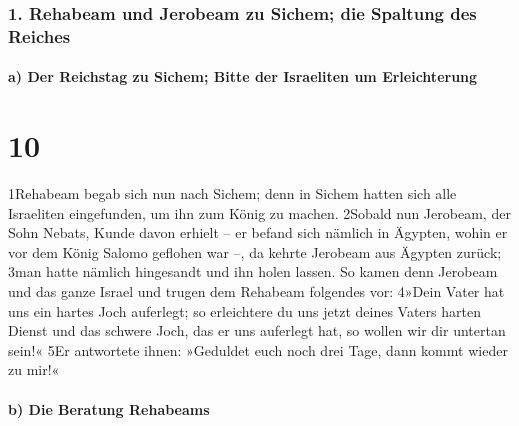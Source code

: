 \hypertarget{rehabeam-und-jerobeam-zu-sichem-die-spaltung-des-reiches}{%
\subsubsection{1. Rehabeam und Jerobeam zu Sichem; die Spaltung des
Reiches}\label{rehabeam-und-jerobeam-zu-sichem-die-spaltung-des-reiches}}

\hypertarget{a-der-reichstag-zu-sichem-bitte-der-israeliten-um-erleichterung}{%
\paragraph{a) Der Reichstag zu Sichem; Bitte der Israeliten um
Erleichterung}\label{a-der-reichstag-zu-sichem-bitte-der-israeliten-um-erleichterung}}

\hypertarget{section-9}{%
\section{10}\label{section-9}}

1Rehabeam begab sich nun nach Sichem; denn in Sichem hatten sich alle
Israeliten eingefunden, um ihn zum König zu machen. 2Sobald nun
Jerobeam, der Sohn Nebats, Kunde davon erhielt -- er befand sich nämlich
in Ägypten, wohin er vor dem König Salomo geflohen war --, da kehrte
Jerobeam aus Ägypten zurück; 3man hatte nämlich hingesandt und ihn holen
lassen. So kamen denn Jerobeam und das ganze Israel und trugen dem
Rehabeam folgendes vor: 4»Dein Vater hat uns ein hartes Joch auferlegt;
so erleichtere du uns jetzt deines Vaters harten Dienst und das schwere
Joch, das er uns auferlegt hat, so wollen wir dir untertan sein!« 5Er
antwortete ihnen: »Geduldet euch noch drei Tage, dann kommt wieder zu
mir!«

\hypertarget{b-die-beratung-rehabeams}{%
\paragraph{b) Die Beratung Rehabeams}\label{b-die-beratung-rehabeams}}

